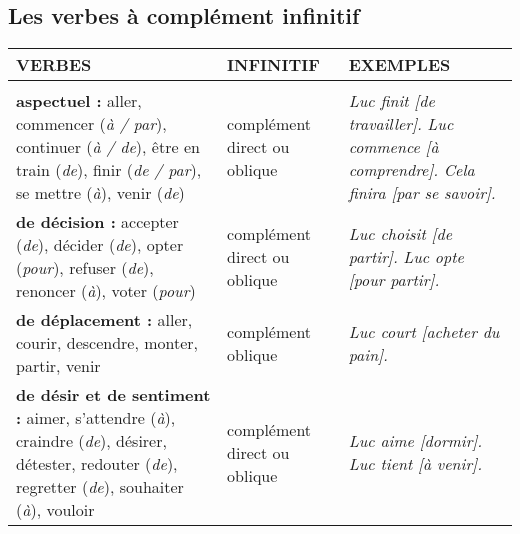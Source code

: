 \documentclass[UTF8]{report}
\begin{document}
\newpage

\subsection{Les verbes à complément infinitif}


\begin{table}[H]
    \centering
    \small
    \begin{adjustbox}{max width=\textwidth}
        \begin{tabular}{| L{6.8cm} | L{2.5cm} | L{5.5cm} |} %
        \hline
        \textbf{VERBES} & \textbf{INFINITIF} & \textbf{EXEMPLES} \\
        \hline
         \\ %
        \hline
        \textbf{aspectuel :} \newline aller, commencer (\textit{à / par}), continuer (\textit{à / de}), être en train (\textit{de}), finir (\textit{de / par}), se mettre (\textit{à}), venir (\textit{de}) & complément direct ou oblique & \textit{Luc finit [de travailler].} \newline \textit{Luc commence [à comprendre].} \newline \textit{Cela finira [par se savoir].} \\
        \hline
        \textbf{de décision :} \newline accepter (\textit{de}), décider (\textit{de}), opter (\textit{pour}), refuser (\textit{de}), renoncer (\textit{à}), voter (\textit{pour}) & complément direct ou oblique & \textit{Luc choisit [de partir].} \newline \textit{Luc opte [pour partir].} \\
        \hline
        \textbf{de déplacement :} \newline aller, courir, descendre, monter, partir, venir & complément oblique & \textit{Luc court [acheter du pain].} \\
        \hline
        \textbf{de désir et de sentiment :} \newline aimer, s’attendre (\textit{à}), craindre (\textit{de}), désirer, détester, redouter (\textit{de}), regretter (\textit{de}), souhaiter (\textit{à}), vouloir & complément direct ou oblique & \textit{Luc aime [dormir].} \newline \textit{Luc tient [à venir].} \\

\end{tabular}
\end{adjustbox}
\end{table}
\end{document}
